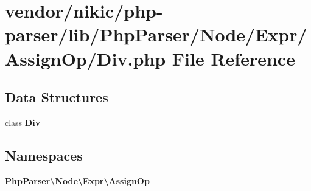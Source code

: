 \section{vendor/nikic/php-\/parser/lib/\+Php\+Parser/\+Node/\+Expr/\+Assign\+Op/\+Div.php File Reference}
\label{_assign_op_2_div_8php}
\subsection*{Data Structures}
\begin{DoxyCompactItemize}
\item 
class {\bf Div}
\end{DoxyCompactItemize}
\subsection*{Namespaces}
\begin{DoxyCompactItemize}
\item 
 {\bf Php\+Parser\textbackslash{}\+Node\textbackslash{}\+Expr\textbackslash{}\+Assign\+Op}
\end{DoxyCompactItemize}
